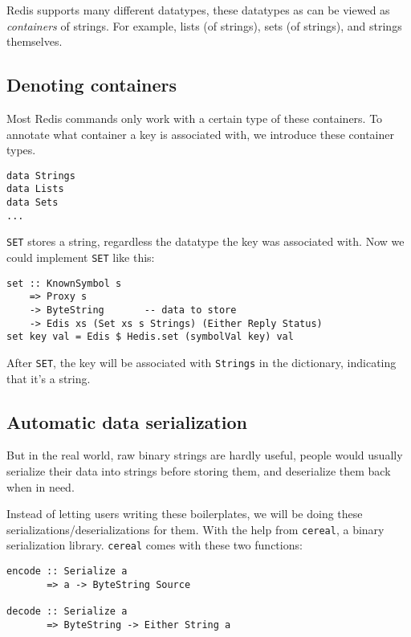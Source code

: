 \documentclass[pldi]{sigplanconf-pldi16}
\begin{document}
Redis supports many different datatypes, these datatypes as can be viewed as
 \emph{containers} of strings. For example, lists (of strings),
 sets (of strings), and strings themselves.

\subsection{Denoting containers}
Most Redis commands only work with a certain type of these containers. To
 annotate what container a key is associated with, we introduce these container
 types.

\begin{verbatim}
data Strings
data Lists
data Sets
...
\end{verbatim}

\texttt{SET} stores a string, regardless the datatype the key was
 associated with. Now we could implement \texttt{SET} like this:

\begin{verbatim}
set :: KnownSymbol s
    => Proxy s
    -> ByteString       -- data to store
    -> Edis xs (Set xs s Strings) (Either Reply Status)
set key val = Edis $ Hedis.set (symbolVal key) val
\end{verbatim}

After \texttt{SET}, the key will be associated with
 \texttt{Strings} in the dictionary, indicating that it's a string.

\subsection{Automatic data serialization}
But in the real world, raw binary strings are hardly useful, people would
 usually serialize their data into strings before storing them, and deserialize
 them back when in need.

Instead of letting users writing these boilerplates, we will be doing these
 serializations/deserializations for them. With the help from
 \texttt{cereal}, a binary serialization library.
 \texttt{cereal} comes with these two functions:

\begin{verbatim}
encode :: Serialize a
       => a -> ByteString Source

decode :: Serialize a
       => ByteString -> Either String a
\end{verbatim}
\end{document}
